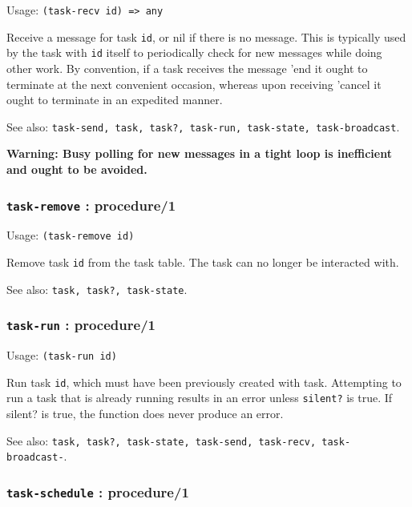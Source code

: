 \documentclass[
]{article}
\newcommand{\passthrough}[1]{#1}
\begin{document}
Usage: \passthrough{\lstinline!(task-recv id) => any!}

Receive a message for task \passthrough{\lstinline!id!}, or nil if there
is no message. This is typically used by the task with
\passthrough{\lstinline!id!} itself to periodically check for new
messages while doing other work. By convention, if a task receives the
message 'end it ought to terminate at the next convenient occasion,
whereas upon receiving 'cancel it ought to terminate in an expedited
manner.

See also:
\passthrough{\lstinline!task-send, task, task?, task-run, task-state, task-broadcast!}.

\textbf{Warning: Busy polling for new messages in a tight loop is
inefficient and ought to be avoided.}

\hypertarget{task-remove-procedure1}{%
\subsubsection{\texorpdfstring{\texttt{task-remove} :
procedure/1}{task-remove : procedure/1}}\label{task-remove-procedure1}}

Usage: \passthrough{\lstinline!(task-remove id)!}

Remove task \passthrough{\lstinline!id!} from the task table. The task
can no longer be interacted with.

See also: \passthrough{\lstinline!task, task?, task-state!}.

\hypertarget{task-run-procedure1}{%
\subsubsection{\texorpdfstring{\texttt{task-run} :
procedure/1}{task-run : procedure/1}}\label{task-run-procedure1}}

Usage: \passthrough{\lstinline!(task-run id)!}

Run task \passthrough{\lstinline!id!}, which must have been previously
created with task. Attempting to run a task that is already running
results in an error unless \passthrough{\lstinline!silent?!} is true. If
silent? is true, the function does never produce an error.

See also:
\passthrough{\lstinline!task, task?, task-state, task-send, task-recv, task-broadcast-!}.

\hypertarget{task-schedule-procedure1}{%
\subsubsection{\texorpdfstring{\texttt{task-schedule} :
procedure/1}{task-schedule : procedure/1}}\label{task-schedule-procedure1}}
\end{document}
